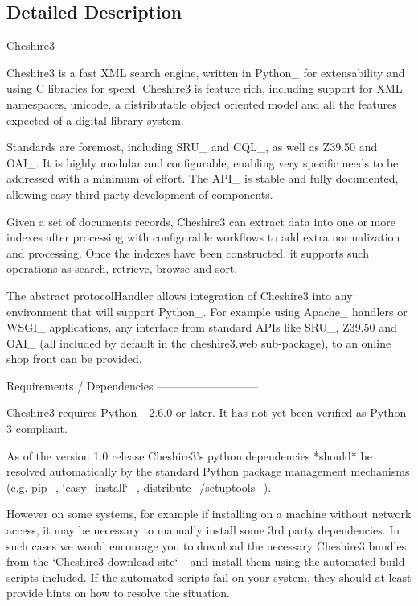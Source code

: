 \subsection{Detailed Description}
\begin{DoxyVerb}Cheshire3

Cheshire3 is a fast XML search engine, written in Python_ for
extensability and using C libraries for speed. Cheshire3 is feature
rich, including support for XML namespaces, unicode, a distributable
object oriented model and all the features expected of a digital library
system.

Standards are foremost, including SRU_ and CQL_, as well as Z39.50 and
OAI_. It is highly modular and configurable, enabling very specific needs
to be addressed with a minimum of effort. The API_ is stable and fully
documented, allowing easy third party development of components.

Given a set of documents records, Cheshire3 can extract data into one or
more indexes after processing with configurable workflows to add extra
normalization and processing. Once the indexes have been constructed, it
supports such operations as search, retrieve, browse and sort.

The abstract protocolHandler allows integration of Cheshire3 into any
environment that will support Python_. For example using Apache_ handlers
or WSGI_ applications, any interface from standard APIs like SRU_, Z39.50
and OAI_ (all included by default in the cheshire3.web sub-package), to
an online shop front can be provided.


Requirements / Dependencies
---------------------------

Cheshire3 requires Python_ 2.6.0 or later. It has not yet been verified
as Python 3 compliant.

As of the version 1.0 release Cheshire3's python dependencies *should* be
resolved automatically by the standard Python package management
mechanisms (e.g. pip_, `easy_install`_, distribute_/setuptools_).

However on some systems, for example if installing on a machine without
network access, it may be necessary to manually install some 3rd party
dependencies. In such cases we would encourage you to download the
necessary Cheshire3 bundles from the `Cheshire3 download site`_ and install
them using the automated build scripts included. If the automated scripts
fail on your system, they should at least provide hints on how to resolve
the situation.


\end{DoxyVerb}
